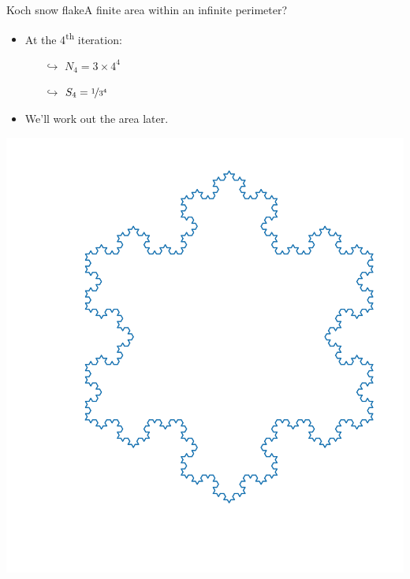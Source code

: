 \documentclass[usenames,dvipsnames,svgnames,10pt,aspectratio=169]{beamer}
\begin{document}
\begin{frame}[t, c]{Koch snow flake}{A finite area within an infinite perimeter?}
	\centering
	\begin{minipage}{.48\textwidth}
		\begin{itemize}
			\item At the 4\textsuperscript{th} iteration:
			\begin{itemize}
				\item[$\hookrightarrow$] $N_4 = 3 \times 4^4$
				\item[$\hookrightarrow$] $S_4 = \nicefrac{1}{3^4}$
			\end{itemize}

			\bigskip

			\item We'll work out the area later.
		\end{itemize}
	\end{minipage}%
	\hfill
	\begin{minipage}{.48\textwidth}
		\centering
		\includegraphics[width=.8\textwidth]{koch_4_it}
	\end{minipage}

	\vspace{1cm}
\end{frame}
\end{document}
